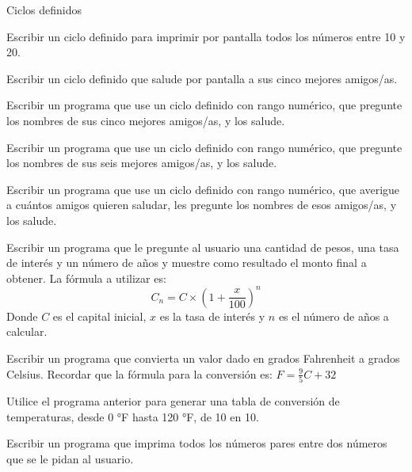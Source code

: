 \begin{ejercicio} Ciclos definidos
\begin{partes}
	\item Escribir un ciclo definido para imprimir por pantalla
todos los números entre 10 y 20.
	\item Escribir un ciclo definido que salude por pantalla a
sus cinco mejores amigos/as.
	\item Escribir un programa que use un ciclo definido con
rango numérico, que pregunte los nombres de sus cinco mejores
amigos/as, y los salude.
	\item Escribir un programa que use un ciclo definido con
rango numérico, que pregunte los nombres de sus seis mejores
amigos/as, y los salude.
	\item Escribir un programa que use un ciclo definido con
rango numérico, que averigue a cuántos amigos quieren saludar, les
pregunte los nombres de esos amigos/as, y los salude.
\end{partes}
\end{ejercicio}

\begin{ejercicio}
Escribir un programa que le pregunte al usuario una cantidad de pesos,
una tasa de interés y un número de años y muestre como resultado el monto
final a obtener.  La fórmula a utilizar es:
\begin{displaymath}
C_n = C \times (1+\frac{x}{100})^n
\end{displaymath}
Donde $C$ es el capital inicial, $x$ es la tasa de interés y $n$ es el
número de años a calcular.
\end{ejercicio}

\begin{ejercicio}
Escribir un programa que convierta un valor dado en grados Fahrenheit a
grados Celsius.  Recordar que la fórmula para la conversión es:
$F = \frac{9}{5}C+32$
\end{ejercicio}

\begin{ejercicio}
Utilice el programa anterior para generar una tabla de conversión de
temperaturas, desde 0 °F hasta 120 °F, de 10 en 10.
\end{ejercicio}

\begin{ejercicio}
Escribir un programa que imprima todos los números pares entre dos números
que se le pidan al usuario.
\end{ejercicio}

